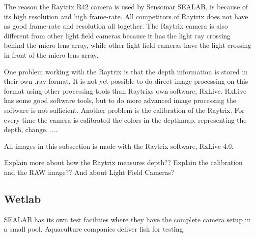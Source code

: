 The reason the Raytrix R42 camera is used by Sensomar SEALAB, is because of its high resolution and high frame-rate. All competitors of Raytrix does not have as good frame-rate and resolution all together. The Raytrix camera is also different from other light field cameras because it has the light ray crossing behind the micro lens array, while other light field cameras have the light crossing in front of the micro lens array.

One problem working with the Raytrix is that the depth information is stored in their own .ray format. It is not yet possible to do direct image processing on this format using other processing tools than Raytrixs own software, RxLive. RxLive has some good software tools, but to do more advanced image processing the software is not sufficient.
Another problem is the calibration of the Raytrix. For every time the camera is calibrated the colors in the depthmap, representing the depth, change. ....

All images in this subsection is made with the Raytrix software, RxLive 4.0.



{\color{red}Explain more about how the Raytrix measures depth?? Explain the calibration and the RAW image?? And about Light Field Cameras?}





\subsection{Wetlab}\label{wetlab}

SEALAB has its own test facilities where they have the complete camera setup in a small pool. Aquaculture companies deliver fish for testing.


